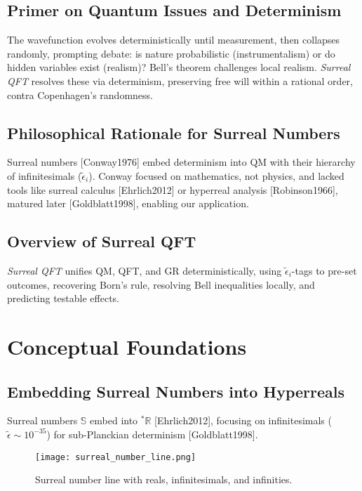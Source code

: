 \documentclass{article}
\begin{document}
\subsection{Primer on Quantum Issues and Determinism}
The wavefunction evolves deterministically until measurement, then collapses randomly, prompting debate: is nature probabilistic (instrumentalism) or do hidden variables exist (realism)? Bell’s theorem challenges local realism. \textit{Surreal QFT} resolves these via determinism, preserving free will within a rational order, contra Copenhagen’s randomness.

\subsection{Philosophical Rationale for Surreal Numbers}
Surreal numbers [Conway1976] embed determinism into QM with their hierarchy of infinitesimals (\(\tilde{\epsilon}_i\)). Conway focused on mathematics, not physics, and lacked tools like surreal calculus [Ehrlich2012] or hyperreal analysis [Robinson1966], matured later [Goldblatt1998], enabling our application.

\subsection{Overview of Surreal QFT}
\textit{Surreal QFT} unifies QM, QFT, and GR deterministically, using \(\tilde{\epsilon}_i\)-tags to pre-set outcomes, recovering Born’s rule, resolving Bell inequalities locally, and predicting testable effects.

\section{Conceptual Foundations}
\subsection{Embedding Surreal Numbers into Hyperreals}
Surreal numbers \(\mathbb{S}\) embed into \({}^*\mathbb{R}\) [Ehrlich2012], focusing on infinitesimals (\(\tilde{\epsilon} \sim 10^{-35}\)) for sub-Planckian determinism [Goldblatt1998].

\begin{figure}[htbp]
    \centering
    \texttt{[image: surreal\_number\_line.png]}
    \caption{Surreal number line with reals, infinitesimals, and infinities.}
    \label{fig:surreal_line}
\end{figure}
\end{document}
